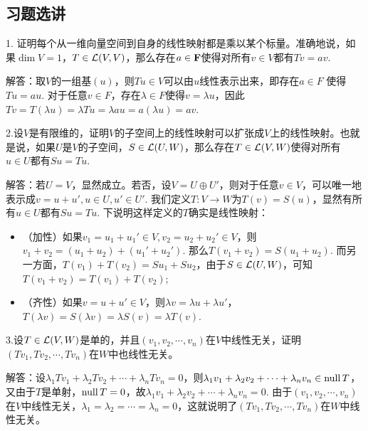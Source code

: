 \documentclass[hyperref,]{ctexart}
\providecommand{\tightlist}{%
  \setlength{\itemsep}{0pt}\setlength{\parskip}{0pt}}
\begin{document}
\subsection{习题选讲}\label{ux4e60ux9898ux9009ux8bb2-3}

\noindent{} 1.
证明每个从一维向量空间到自身的线性映射都是乘以某个标量。准确地说，如果\(\dim V=1\)，\(T\in \mathcal{L}(V,V)\)，那么存在\(a\in\mathbf{F}\)使得对所有\(v\in V\)都有\(Tv=av\).

\noindent{}
解答：取\(V\)的一组基\((u)\)，则\(Tu\in V\)可以由\(u\)线性表示出来，即存在\(a\in F\)
使得\(Tu = au\).
对于任意\(v\in F\)，存在\(\lambda\in F\)使得\(v= \lambda u\)，因此\(Tv=T(\lambda u)=\lambda Tu=\lambda au=a(\lambda u)=a v\).

\bigskip

\noindent{}
2.设\(V\)是有限维的，证明\(V\)的子空间上的线性映射可以扩张成\(V\)上的线性映射。也就是说，如果\(U\)是\(V\)的子空间，\(S\in\mathcal{L}(U,W)\)，那么存在\(T\in\mathcal{L}(V,W)\)使得对所有\(u\in U\)都有\(Su=Tu\).

\noindent{}
解答：若\(U=V\)，显然成立。若否，设\(V=U\oplus U'\)，则对于任意\(v\in V\)，可以唯一地表示成\(v = u+u',u\in U,u'\in U'\).
我们定义\(T:V\rightarrow W\)为\(T(v)=S(u)\)，显然有所有\(u\in U\)都有\(Su=Tu\).
下说明这样定义的\(T\)确实是线性映射：

\begin{itemize}
\tightlist
\item
  （加性）如果\(v_1=u_1+u_1'\in V,v_2=u_2+u_2'\in V\)，则\(v_1+v_2=(u_1+u_2)+(u_1'+u_2')\).
  那么\(T(v_1+v_2)= S(u_1+u_2)\).
  而另一方面，\(T(v_1)+T(v_2)=Su_1+Su_2\)，由于\(S\in \mathcal{L}(U,W)\)，可知\(T(v_1+v_2)=T(v_1)+T(v_2)\);
\item
  （齐性）如果\(v = u+u'\in V\)，则\(\lambda v=\lambda u+\lambda u'\)，\(T(\lambda v)= S(\lambda v)=\lambda S(v)=\lambda T(v)\).
\end{itemize}

\bigskip

\noindent{}
3.设\(T\in\mathcal{L}(V,W)\)是单的，并且\((v_1,v_2,\cdots,v_n)\)在\(V\)中线性无关，证明\((Tv_1,Tv_2,\cdots,Tv_n)\)在\(W\)中也线性无关。

\noindent{}
解答：设\(\lambda_1 Tv_1+\lambda_2 Tv_2 +\cdots+\lambda_nTv_n=0\)，则\(\lambda_1 v_1+\lambda_2 v_2+\cdots+\lambda_n v_n \in \mathrm{null}\, T\)，又由于\(T\)是单射，\(\mathrm{null}\, T={0}\)，故\(\lambda_1 v_1+\lambda_2v_2+\cdots+\lambda_n v_n=0\).
由于\((v_1,v_2,\cdots,v_n)\)在\(V\)中线性无关，\(\lambda_1=\lambda_2=\cdots=\lambda_n =0\)，这就说明了\((Tv_1,Tv_2,\cdots,Tv_n)\)在\(W\)中线性无关。
\end{document}
